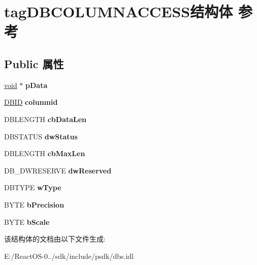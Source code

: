 \hypertarget{structtag_d_b_c_o_l_u_m_n_a_c_c_e_s_s}{}\section{tag\+D\+B\+C\+O\+L\+U\+M\+N\+A\+C\+C\+E\+S\+S结构体 参考}
\label{structtag_d_b_c_o_l_u_m_n_a_c_c_e_s_s}
\subsection*{Public 属性}
\begin{DoxyCompactItemize}
\item 
\mbox{\label{structtag_d_b_c_o_l_u_m_n_a_c_c_e_s_s_a4f473b461b44811fb71f91c53962401d}} 
\hyperlink{interfacevoid}{void} $\ast$ {\bfseries p\+Data}
\item 
\mbox{\label{structtag_d_b_c_o_l_u_m_n_a_c_c_e_s_s_a79ac2fe9b9f5a7e5d5617c215bb6ddaf}} 
\hyperlink{structtag_d_b_i_d}{D\+B\+ID} {\bfseries columnid}
\item 
\mbox{\label{structtag_d_b_c_o_l_u_m_n_a_c_c_e_s_s_a6dd6ee9f2dd17dbb91272c180ee26651}} 
D\+B\+L\+E\+N\+G\+TH {\bfseries cb\+Data\+Len}
\item 
\mbox{\label{structtag_d_b_c_o_l_u_m_n_a_c_c_e_s_s_a3777b86dd723514ad3fc409b9edf0c6c}} 
D\+B\+S\+T\+A\+T\+US {\bfseries dw\+Status}
\item 
\mbox{\label{structtag_d_b_c_o_l_u_m_n_a_c_c_e_s_s_aa25e4a6971e467cf1c95bfcd2b7bc077}} 
D\+B\+L\+E\+N\+G\+TH {\bfseries cb\+Max\+Len}
\item 
\mbox{\label{structtag_d_b_c_o_l_u_m_n_a_c_c_e_s_s_a099750560f7338594a7549e0f609579d}} 
D\+B\+\_\+\+D\+W\+R\+E\+S\+E\+R\+VE {\bfseries dw\+Reserved}
\item 
\mbox{\label{structtag_d_b_c_o_l_u_m_n_a_c_c_e_s_s_a0ef1d3447bee0e0a649d03b8f14aa8e6}} 
D\+B\+T\+Y\+PE {\bfseries w\+Type}
\item 
\mbox{\label{structtag_d_b_c_o_l_u_m_n_a_c_c_e_s_s_af6719d5283cb5ce7455ea2b969dad468}} 
B\+Y\+TE {\bfseries b\+Precision}
\item 
\mbox{\label{structtag_d_b_c_o_l_u_m_n_a_c_c_e_s_s_a2d4e8ee4f0c1faf0c527ad808cfb4b8c}} 
B\+Y\+TE {\bfseries b\+Scale}
\end{DoxyCompactItemize}


该结构体的文档由以下文件生成\+:\begin{DoxyCompactItemize}
\item 
E\+:/\+React\+O\+S-\/0../sdk/include/psdk/dbs.\+idl\end{DoxyCompactItemize}
